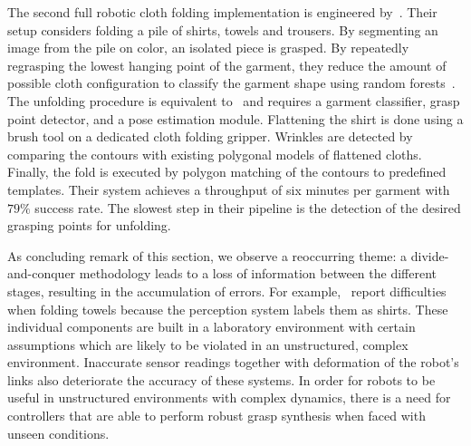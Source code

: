 The second full robotic cloth folding implementation is engineered by~\textcite{Doumanoglou2016}. Their setup considers folding a pile of shirts, towels and trousers. By segmenting an image from the pile on color, an isolated piece is grasped. By repeatedly regrasping the lowest hanging point of the garment, they reduce the amount of possible cloth configuration to classify the garment shape using random forests~\autocite{Breiman2001}. The unfolding procedure is equivalent to~\autocite{Maitin2010} and requires a garment classifier, grasp point detector, and a pose estimation module. Flattening the shirt is done using a brush tool on a dedicated cloth folding gripper. Wrinkles are detected by comparing the contours with existing polygonal models of flattened cloths. Finally, the fold is executed by polygon matching of the contours to predefined templates. Their system achieves a throughput of six minutes per garment with $79\%$ success rate. The slowest step in their pipeline is the detection of the desired grasping points for unfolding.

As concluding remark of this section, we observe a reoccurring theme: a divide-and-conquer methodology leads to a loss of information between the different stages, resulting in the accumulation of errors. For example,~\textcite{Doumanoglou2016} report difficulties when folding towels because the perception system labels them as shirts. These individual components are built in a laboratory environment with certain assumptions which are likely to be violated in an unstructured, complex environment. Inaccurate sensor readings together with deformation of the robot’s links also deteriorate the accuracy of these systems. In order for robots to be useful in unstructured environments with complex dynamics, there is a need for controllers that are able to perform robust grasp synthesis when faced with unseen conditions.
